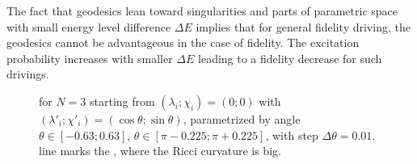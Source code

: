 The fact that geodesics lean toward singularities and parts of parametric space with small energy level difference $\Delta E$ implies that for general fidelity driving, the geodesics cannot be advantageous in the case of fidelity. The excitation probability increases with smaller $\Delta E$ leading to a fidelity decrease for such drivings.


\begin{figure}[H]
    \centering
    \caption{ for $N=3$ starting from $(\lambda_i;\chi_i)=(0;0)$ with $(\lambda'_i;\chi'_i)=(\cos\theta;\sin\theta)$, parametrized by angle $\theta\in [-0.63;0.63]$, $\theta\in [\pi-0.225;\pi+0.225]$, with step $\Delta\theta=0.01$.  line marks the , where the Ricci curvature is big.}
    \label{fig:N=3_geodesics}    
\end{figure}



